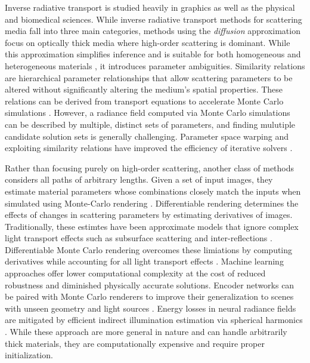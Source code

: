 Inverse radiative transport \cite{bal2009inverse} is studied heavily in graphics as well as the physical and biomedical sciences. While inverse radiative transport methods for scattering media fall into three main categories, methods using the \textit{diffusion} approximation focus on optically thick media where high-order scattering is dominant. While this approximation simplifies inference and is suitable for both homogeneous and heterogeneous materials \cite{farrell1992diffusion, munoz2011bssrdf, papas2013fabricating}, it introduces parameter ambiguities. Similarity relations are hierarchical parameter relationships that allow scattering parameters to be altered without significantly altering the medium's spatial properties. These relations can be derived from transport equations to accelerate Monte Carlo simulations \cite{wyman1989similarity}. However, a radiance field computed via Monte Carlo simulations can be described by multiple, distinct sets of parameters, and finding mulutiple candidate solution sets is generally challenging. Parameter space warping and exploiting similarity relations have improved the efficiency of iterative solvers \cite{zhao2014high}.

Rather than focusing purely on high-order scattering, another class of methods considers all paths of arbitrary lengths. Given a set of input images, they estimate material parameters whose combinations closely match the inputs when simulated using Monte-Carlo rendering \cite{dutre2018advanced, novak2018monte}. Differentiable rendering determines the effects of changes in scattering parameters by estimating derivatives of images. Traditionally, these estimtes have been approximate models that ignore complex light transport effects such as subsurface scattering and inter-reflections \cite{loper2014opendr}. Differentiable Monte Carlo rendering overcomes these limiations by computing derivatives while accounting for all light transport effects \cite{gkioulekas2016evaluation, gkioulekas2013inverse, khungurn2015matching, nimier2020radiative, nimier2019mitsuba}. Machine learning approaches offer lower computational complexity at the cost of reduced robustness and diminished physically accurate solutions. Encoder networks can be paired with Monte Carlo renderers to improve their generalization to scenes with unseen geometry and light sources \cite{wu2017neural, che2020towards}. Energy losses in neural radiance fields are mitigated by efficient indirect illumination estimation via spherical harmonics \cite{zheng2021neural}. While these approach are more general in nature and can handle arbitrarily thick materials, they are computationally expensive and require proper initialization.

